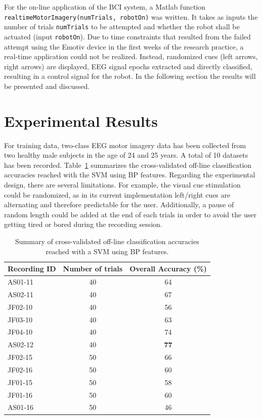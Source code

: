 \documentclass[a4paper,oneside, openright,12pt]{report}
\begin{document}
For the on-line application of the BCI system, a Matlab function\\ \texttt{realtimeMotorImagery(numTrials, robotOn)} was written. It takes as inputs the number of trials \texttt{numTrials} to be attempted and whether the robot shall be actuated (input \texttt{robotOn}). Due to time constraints that resulted from the failed attempt using the Emotiv device in the first weeks of the research practice, a real-time application could not be realized. Instead, randomized cues (left arrows, right arrows) are displayed, EEG signal epochs extracted and directly classified, resulting in a control signal for the robot. In the following section the results will be presented and discussed.


\section{Experimental Results}
For training data, two-class EEG motor imagery data has been collected from two healthy male subjects in the age of 24 and 25 years. A total of 10 datasets has been recorded. Table~\ref{tab:class-results} summarizes the cross-validated off-line classification accuracies reached with the SVM using BP features. Regarding the experimental design, there are several limitations. For example, the visual cue stimulation could be randomized, as in its current implementation left/right cues are alternating and therefore predictable for the user. Additionally, a pause of random length could be added at the end of each trials in order to avoid the user getting tired or bored during the recording session.

\begin{table}[h!!!]
	\centering
	\begin{tabular}{lcc}
		\textbf{Recording ID}	&\textbf{Number of trials}  &\textbf{Overall Accuracy (\%)} \\ 
		\hline 
		\hline  AS01-11&  40& 64\\ 
		\hline	AS02-11&  40& 67\\ 
		\hline	JF02-10&  40& 56\\ 
		\hline	JF03-10&  40& 63\\
		\hline	JF04-10&  40& 74\\
		\hline  AS02-12&  40& \textbf{77}\\
		\hline  JF02-15&  50& 66\\
		\hline  JF02-16&  50&  60\\
		\hline  JF01-15&  50& 58\\
		\hline  JF01-16&  50& 60\\
		\hline  AS01-16&  50& 46\\
	\end{tabular} 
	\caption{Summary of cross-validated off-line classification accuracies reached with a SVM using BP features.}
	\label{tab:class-results}
\end{table}
\end{document}

